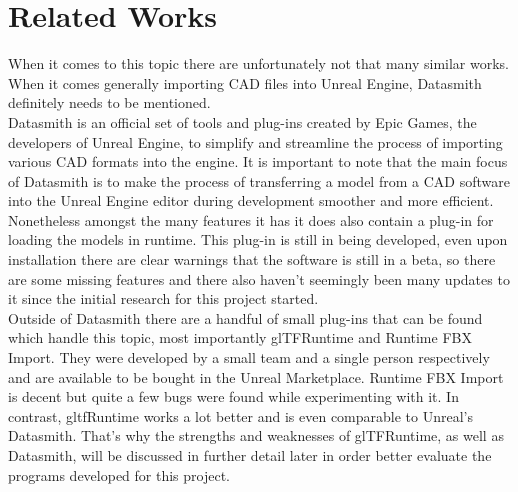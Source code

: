 \section{Related Works}

When it comes to this topic there are unfortunately not that many similar works. When it comes generally importing CAD files into Unreal Engine, Datasmith definitely needs to be mentioned.\\ Datasmith is an official set of tools and plug-ins created by Epic Games, the developers of Unreal Engine, to simplify and streamline the process of importing various CAD formats into the engine\cite{}. It is important to note that the main focus of Datasmith is to make the process of transferring a model from a CAD software into the Unreal Engine editor during development smoother and more efficient\cite{}. Nonetheless amongst the many features it has it does also contain a plug-in for loading the models in runtime. This plug-in is still in being developed, even upon installation there are clear warnings that the software is still in a beta, so there are some missing features and there also haven't seemingly been many updates to it since the initial research for this project started\cite{}.\\
Outside of Datasmith there are a handful of small plug-ins that can be found which handle this topic, most importantly glTFRuntime\cite{} and Runtime FBX Import\cite{}. They were developed by a small team and a single person respectively and are available to be bought in the Unreal Marketplace. Runtime FBX Import is decent but quite a few bugs were found while experimenting with it. In contrast, gltfRuntime works a lot better and is even comparable to Unreal's Datasmith. That's why the strengths and weaknesses of glTFRuntime, as well as Datasmith, will be discussed in further detail later in order better evaluate the programs developed for this project. 